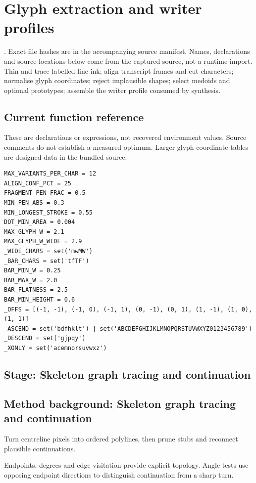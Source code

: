 \chapter{Glyph extraction and writer profiles}\label{module:style}
. Exact file hashes are in the accompanying source manifest. Names, declarations and source locations below come from the captured source, not a runtime import.
Thin and trace labelled line ink; align transcript frames and cut characters; normalise glyph coordinates; reject implausible shapes; select medoids and optional prototypes; assemble the writer profile consumed by synthesis.



\section*{Current function reference}
These are declarations or expressions, not recovered environment values. Source comments do not establish a measured optimum. Larger glyph coordinate tables are designed data in the bundled source.
\begin{lstlisting}[style=plain]
MAX_VARIANTS_PER_CHAR = 12
ALIGN_CONF_PCT = 25
FRAGMENT_PEN_FRAC = 0.5
MIN_PEN_ABS = 0.3
MIN_LONGEST_STROKE = 0.55
DOT_MIN_AREA = 0.004
MAX_GLYPH_W = 2.1
MAX_GLYPH_W_WIDE = 2.9
_WIDE_CHARS = set('mwMW')
_BAR_CHARS = set('tfTF')
BAR_MIN_W = 0.25
BAR_MAX_W = 2.0
BAR_FLATNESS = 2.5
BAR_MIN_HEIGHT = 0.6
_OFFS = [(-1, -1), (-1, 0), (-1, 1), (0, -1), (0, 1), (1, -1), (1, 0), (1, 1)]
_ASCEND = set('bdfhklt') | set('ABCDEFGHIJKLMNOPQRSTUVWXYZ0123456789')
_DESCEND = set('gjpqy')
_XONLY = set('acemnorsuvwxz')
\end{lstlisting}
\section*{Stage: Skeleton graph tracing and continuation}
\section{Method background: Skeleton graph tracing and continuation}\label{method:trace}
Turn centreline pixels into ordered polylines, then prune stubs and reconnect plausible continuations.


Endpoints, degrees and edge visitation provide explicit topology. Angle tests use opposing endpoint directions to distinguish continuation from a sharp turn.


